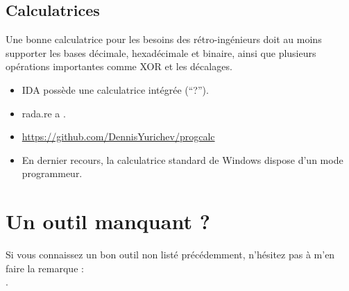 \subsection{Calculatrices}

Une bonne calculatrice pour les besoins des rétro-ingénieurs doit au moins supporter
les bases décimale, hexadécimale et binaire, ainsi que plusieurs opérations importantes
comme XOR et les décalages.

\begin{itemize}

\item IDA possède une calculatrice intégrée (``?'').

\item rada.re a .

\item \url{https://github.com/DennisYurichev/progcalc}

\item En dernier recours, la calculatrice standard de Windows dispose d'un mode
programmeur.

\end{itemize}

\section{Un outil manquant ?}

Si vous connaissez un bon outil non listé précédemment, n'hésitez pas à m'en faire la remarque : \\
\TT{\EMAIL}.

